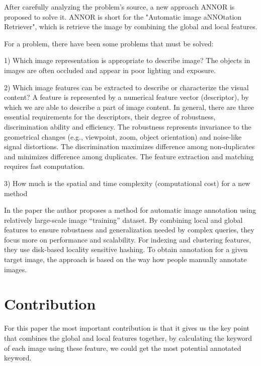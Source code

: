 \documentclass[pdftex,12pt,a4paper]{article}
\begin{document}
After carefully analyzing the problem's source, a new approach ANNOR is proposed to solve it.
ANNOR is short for the "Automatic image aNNOtation Retriever", which is retrieve the image by combining the global
and local features.

For a problem, there have been some problems that must be solved:

1) Which image representation is appropriate to describe image?
The objects in images are often occluded and appear in poor
lighting and exposure.

2) Which image features can be extracted to describe or characterize
the visual content? A feature is represented by a numerical
feature vector (descriptor), by which we are able to describe a
part of image content. In general, there are three essential
requirements for the descriptors, their degree of robustness,
discrimination ability and efficiency. The robustness represents
invariance to the geometrical changes (e.g., viewpoint, zoom,
object orientation) and noise-like signal distortions. The discrimination
maximizes difference among non-duplicates and
minimizes difference among duplicates. The feature extraction
and matching requires fast computation.

3) How much is the spatial and time complexity (computational cost) for a new method

In the paper the author proposes a method for automatic image annotation
using relatively large-scale image “training” dataset. By combining local
and global features to ensure robustness and generalization needed by
complex queries, they focus more on performance and scalability.
For indexing and clustering features, they use disk-based locality
sensitive hashing. To obtain annotation for a given target image, the
approach is based on the way how people manually annotate images.


\section{Contribution}
For this paper the most important contribution is that it gives us the key point that combines the global
and local features together, by calculating the keyword of each image using these feature, we could get the
most potential annotated keyword.
\end{document}
